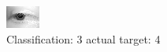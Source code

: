 \begin{figure}[h!]
\begin{center}
\includegraphics[width=0.60\columnwidth]{figures/ID2643_class_3_target_4.png}
\end{center}
\caption{ Classification: 3 actual target: 4}
\label{fig:ID2643_class_3_target_4}
\end{figure}
